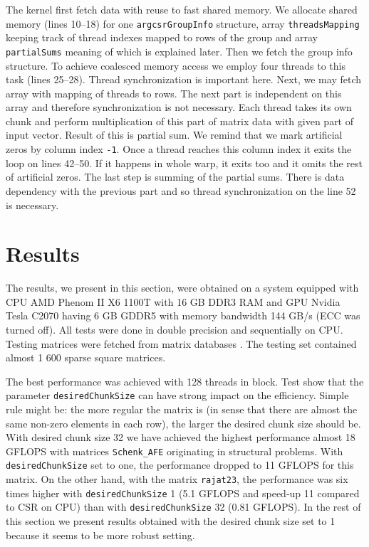 \documentclass{pj}
\begin{document}
The kernel first fetch data with reuse to fast shared memory. We allocate shared memory (lines 10--18) for one {\tt argcsrGroupInfo} structure, array {\tt threadsMapping} keeping track of thread indexes mapped to rows of the group and array {\tt partialSums} meaning of which is explained later. Then we fetch the group info structure. To achieve coalesced memory access we employ four threads to this task (lines 25--28). Thread synchronization is important here. Next, we may fetch array with mapping of threads to rows. The next part is independent on this array and therefore synchronization is not necessary. Each thread takes its own chunk and perform multiplication of this part of matrix data with given part of input vector. Result of this is partial sum. We remind that we mark artificial zeros by column index {\tt -1}. Once a thread reaches this column index it exits the loop on lines 42--50. If it happens in whole warp, it exits too and it omits the rest of artificial zeros. The last step is summing of the partial sums. There is data dependency with the previous part and so thread synchronization on the line 52 is necessary.

\section{Results}
\label{sect:results}

The results, we present in this section, were obtained on a system equipped with CPU AMD Phenom II X6 1100T with 16 GB DDR3 RAM and GPU Nvidia Tesla C2070 having 6 GB GDDR5 with memory bandwidth 144 GB/s (ECC was turned off). All tests were done in double precision and sequentially on CPU. Testing matrices were fetched from matrix databases \cite{BaiDayDemmelDongarra-1996,DavisHu-1994}. The testing set contained almost 1 600 sparse square matrices.

 The best performance was achieved with 128 threads in block. Test show that the parameter {\tt desiredChunkSize} can have strong impact on the efficiency. Simple rule might be: the more regular the matrix is (in sense that there are almost the same non-zero elements in each row), the larger the desired chunk size should be. With desired chunk size 32 we have achieved the highest performance almost 18 GFLOPS with matrices {\tt Schenk\_AFE} originating in structural problems. With {\tt desiredChunkSize} set to one, the performance dropped to 11 GFLOPS for this matrix. On the other hand, with the matrix {\tt rajat23}, the performance was six times higher with {\tt desiredChunkSize} 1 (5.1 GFLOPS and speed-up 11 compared to CSR on CPU) than with {\tt desiredChunkSize} 32 (0.81 GFLOPS). In the rest of this section we present results obtained with the desired chunk size set to 1 because it seems to be more robust setting.
\end{document}

